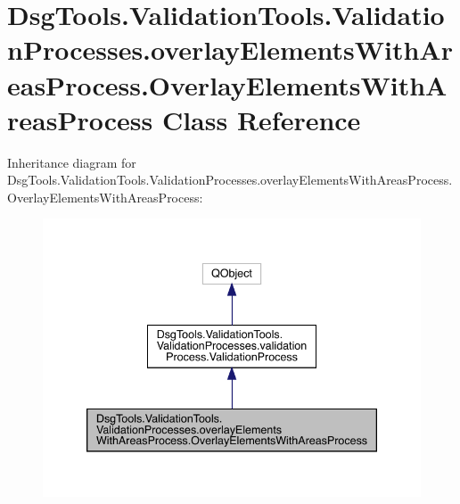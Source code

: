 \hypertarget{class_dsg_tools_1_1_validation_tools_1_1_validation_processes_1_1overlay_elements_with_areas_pro00eacf8cfa659de181e10fade302dbfa}{}\section{Dsg\+Tools.\+Validation\+Tools.\+Validation\+Processes.\+overlay\+Elements\+With\+Areas\+Process.\+Overlay\+Elements\+With\+Areas\+Process Class Reference}
\label{class_dsg_tools_1_1_validation_tools_1_1_validation_processes_1_1overlay_elements_with_areas_pro00eacf8cfa659de181e10fade302dbfa}


Inheritance diagram for Dsg\+Tools.\+Validation\+Tools.\+Validation\+Processes.\+overlay\+Elements\+With\+Areas\+Process.\+Overlay\+Elements\+With\+Areas\+Process\+:
\nopagebreak
\begin{figure}[H]
\begin{center}
\leavevmode
\includegraphics[width=339pt]{class_dsg_tools_1_1_validation_tools_1_1_validation_processes_1_1overlay_elements_with_areas_prob771aa92852f4eb3491e1fe0a51f9778}
\end{center}
\end{figure}


